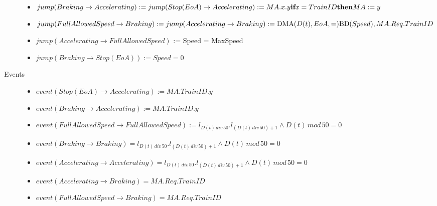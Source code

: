 \begin{mydef}
\begin{description}
\begin{itemize}
	\item  $jump(Braking \to Accelerating) := jump(Stop (EoA) \to Accelerating) := MA.x.y\\ \textbf{if} x = TrainID \\ \textbf{then} MA := y$ 
	

	\item $jump(Full Allowed Speed \to Braking) :=jump(Accelerating \to Braking) := \mathrm{DMA}(D(t),EoA,=) \mathrm{BD}(Speed), MA.Req.TrainID$


	\item $jump(Accelerating \to Full Allowed Speed)$ := Speed = MaxSpeed
	
	\item $jump(Braking \to Stop (EoA)) := Speed = 0$

	\end{itemize}

\item[Events] \hspace*{0mm}
\begin{itemize}
	\item $event (Stop (EoA) \to Accelerating) := MA.TrainID.y$
	\item $event (Braking \to Accelerating) := MA.TrainID.y$
	\item $event(Full Allowed Speed \to Full Allowed Speed) := l_{D(t) \, div \, 50}.l_{(D(t) \, div \, 50) +1} \wedge D(t) \, mod \, 50 = 0$
\item $event(Braking \to Braking) = l_{D(t) \, div \, 50}.l_{(D(t) \, div \, 50) +1} \wedge D(t) \, mod \, 50 = 0$
\item $event(Accelerating \to Accelerating) = l_{D(t) \, div \, 50}.l_{(D(t) \, div \, 50) +1} \wedge D(t) \, mod \, 50 = 0$

	\item $event(Accelerating \to Braking) = MA.Req.TrainID$
	\item $event(Full Allowed Speed \to Braking) = MA.Req.TrainID$
\end{itemize}

\end{description}
\end{mydef}

